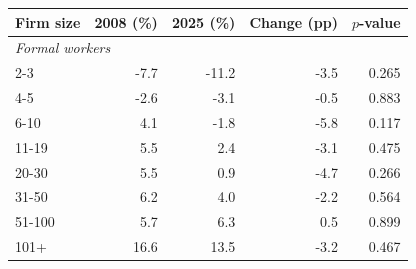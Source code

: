 \begin{tabular}{lrrrr}
\toprule
    Firm size & 2008 (\%) & 2025 (\%) & Change (pp) & $p$-value \\
    \midrule
\multicolumn{5}{l}{\textit{Formal workers}} \\
2-3 & -7.7 & -11.2 & -3.5 & 0.265 \\
4-5 & -2.6 & -3.1 & -0.5 & 0.883 \\
6-10 & 4.1 & -1.8 & -5.8 & 0.117 \\
11-19 & 5.5 & 2.4 & -3.1 & 0.475 \\
20-30 & 5.5 & 0.9 & -4.7 & 0.266 \\
31-50 & 6.2 & 4.0 & -2.2 & 0.564 \\
51-100 & 5.7 & 6.3 & 0.5 & 0.899 \\
101+ & 16.6 & 13.5 & -3.2 & 0.467\\
\bottomrule\end{tabular}
